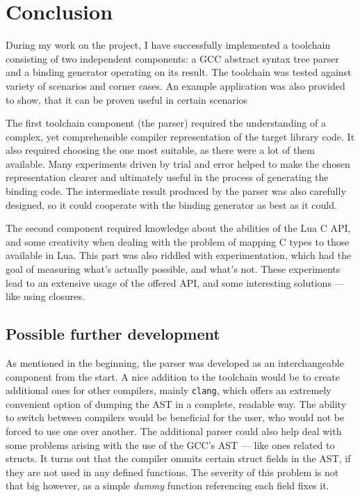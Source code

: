 \documentclass[polish, english]{iithesis}
\begin{document}
\chapter{Conclusion}
  During my work on the project, I have successfully implemented a toolchain consisting of two independent components: a GCC abstract syntax tree parser and a binding generator operating on its result.
  The toolchain was tested against variety of scenarios and corner cases.
  An example application was also provided to show, that it can be proven useful in certain scenarios

  The first toolchain component (the parser) required the understanding of a complex, yet comprehensible compiler representation of the target library code.
  It also required choosing the one most suitable, as there were a lot of them available.
  Many experiments driven by trial and error helped to make the chosen representation clearer and ultimately useful in the process of generating the binding code.
  The intermediate result produced by the parser was also carefully designed, so it could cooperate with the binding generator as best as it could.

  The second component required knowledge about the abilities of the Lua C API, and some creativity when dealing with the problem of mapping C types to those available in Lua.
  This part was also riddled with experimentation, which had the goal of measuring what's actually possible, and what's not.
  These experiments lead to an extensive usage of the offered API, and some interesting solutions --- like using closures.

  \section{Possible further development}
    As mentioned in the beginning, the parser was developed as an interchangeable component from the start.
    A nice addition to the toolchain would be to create additional ones for other compilers, mainly \texttt{clang}, which offers an extremely convenient option of dumping the AST in a complete, readable way.
    The ability to switch between compilers would be beneficial for the user, who would not be forced to use one over another.
    The additional parser could also help deal with some problems arising with the use of the GCC's AST --- like ones related to structs.
    It turns out that the compiler ommits certain struct fields in the AST, if they are not used in any defined functions.
    The severity of this problem is not that big however, as a simple \textit{dummy} function referencing each field fixes it.
\end{document}
